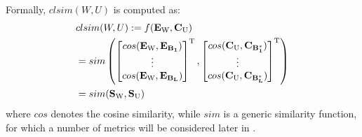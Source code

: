 Formally, $clsim(W,U)$ is computed as:
{\small
\begin{align*}
&clsim(W,U) := f(\mathbf{E_\text{W}},\mathbf{C_\text U}) \\ 
&=sim\left(
\begin{bmatrix}
    cos(\mathbf{E_\text W},\mathbf{E_{ B_1}})\\
    \vdots \\
    cos(\mathbf{E_\text W},\mathbf{E_{B_L}})
\end{bmatrix}^{\rm T},\begin{bmatrix}
    cos(\mathbf{C_\text U},\mathbf{C_{B_1^*}})\\
    \vdots \\
    cos(\mathbf{C_\text U},\mathbf{C_{B_L^*}})
\end{bmatrix}^{\rm T}\right)\\
&=sim(\mathbf{S_\text W},\mathbf{S_\text U}) 
\end{align*}}
where $cos$ denotes the cosine similarity, 
while $sim$ is a generic similarity function, for which a number of
metrics will be considered later in .
%
%

